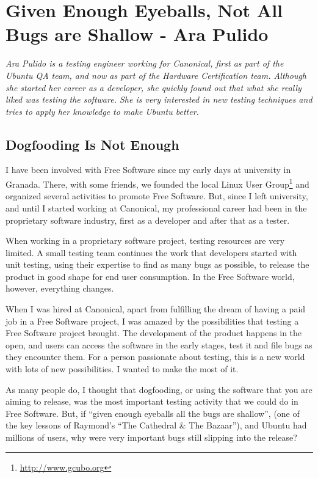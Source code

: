 \chapter{Given Enough Eyeballs, Not All Bugs are Shallow - Ara Pulido}

\textit{Ara Pulido is a testing engineer working for Canonical, first as part of
the Ubuntu QA team, and now as part of the Hardware Certification team. Although
she started her career as a developer, she quickly found out that what she
really liked was testing the software. She is very interested in new testing
techniques and tries to apply her knowledge to make Ubuntu better.}

\section*{Dogfooding Is Not Enough} 

I have been involved with Free Software since my early days at university in
Granada. There, with some friends, we founded the local Linux User
Group\footnote{\url{http://www.gcubo.org}} and organized several activities to
promote Free Software. But, since I left university, and until I started working
at Canonical, my professional career had been in the proprietary software
industry, first as a developer and after that as a tester.

When working in a proprietary software project, testing resources are very
limited. A small testing team continues the work that developers started with
unit testing, using their expertise to find as many bugs as possible, to release
the product in good shape for end user consumption. In the Free Software world,
however, everything changes.

When I was hired at Canonical, apart from fulfilling the dream of having a paid
job in a Free Software project, I was amazed by the possibilities that testing a
Free Software project brought. The development of the product happens in the
open, and users can access the software in the early stages, test it and file
bugs as they encounter them. For a person passionate about testing, this is a new
world with lots of new possibilities. I wanted to make the most of it.

As many people do, I thought that dogfooding, or using the software that you are
aiming to release, was the most important testing activity that we could do in
Free Software. But, if ``given enough eyeballs all the bugs are shallow'', (one of
the key lessons of Raymond's ``The Cathedral \& The Bazaar''), and Ubuntu had
millions of users, why were very important bugs still slipping into the release?


